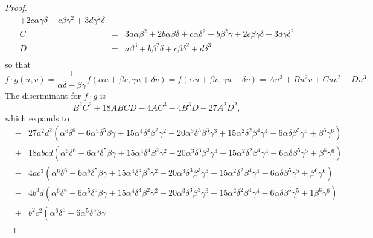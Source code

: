 \documentclass[10pt]{amsart}
\begin{document}
\begin{thm}[5 Points]
\begin{proof}
\begin{eqnarray*}
        + 2 c \alpha \gamma \delta 
        + c \beta \gamma^{2} 
        + 3 d \gamma^{2} \delta\\
        C &=& 3 a \alpha\beta^{2} 
        + 2 b \alpha \beta \delta 
        + c \alpha \delta^{2} 
        + b \beta^{2} \gamma 
        + 2 c \beta \gamma \delta
        + 3 d \gamma \delta^{2}\\
        D &=& a \beta^{3} 
        + b \beta^{2} \delta 
        + c \beta \delta^{2} 
        + d \delta^{3}\\
      \end{eqnarray*}
      so that 
      $$f \cdot g(u,v) = \frac{1}{\alpha\delta - \beta\gamma} f(\alpha u + \beta v, \gamma u + \delta v) = f(\alpha u + \beta v, \gamma u + \delta v) = Au^3 + Bu^2v + Cuv^2 + Du^3.$$
      The discriminant for $f \cdot g$ is
      $$B^2C^2 + 18ABCD - 4AC^3 - 4B^3D - 27A^2D^2,$$ 
      which expands to
      \begin{eqnarray*}
        &-& 27 a^{2} d^{2}\left(\alpha^{6} \delta^{6} 
        - 6 \alpha^{5}\delta^{5} \beta\gamma 
        + 15 \alpha^{4}\delta^{4} \beta^{2}\gamma^{2} 
        - 20 \alpha^{3}\delta^{3} \beta^{3}\gamma^{3} 
        + 15 \alpha^{2}\delta^{2} \beta^{4}\gamma^{4} 
        - 6 \alpha\delta \beta^{5}\gamma^{5} 
        + \beta^{6} \gamma^{6}\right)\\
        &+& 18a b c d \left( \alpha^{6} \delta^{6} 
        - 6 \alpha^{5}\delta^{5} \beta\gamma 
        + 15 \alpha^{4}\delta^{4} \beta^{2}\gamma^{2} 
        - 20 \alpha^{3}\delta^{3} \beta^{3}\gamma^{3} 
        + 15 \alpha^{2}\delta^{2} \beta^{4}\gamma^{4} 
        - 6 \alpha\delta \beta^{5}\gamma^{5} 
        + \beta^{6}\gamma^{6}\right)\\
        &-& 4 a c^{3} \left( \alpha^{6}\delta^{6} 
        - 6 \alpha^{5}\delta^{5} \beta\gamma 
        + 15 \alpha^{4}\delta^{4} \beta^{2}\gamma^{2} 
        - 20 \alpha^{3}\delta^{3} \beta^{3}\gamma^{3} 
        + 15 \alpha^{2}\delta^{2} \beta^{4}\gamma^{4} 
        - 6 \alpha\delta \beta^{5}\gamma^{5} 
        + \beta^{6}\gamma^{6}\right)\\
        &-& 4b^{3} d \left(\alpha^{6} \delta^{6} 
        - 6 \alpha^{5}\delta^{5} \beta\gamma 
        + 15 \alpha^{4}\delta^{4} \beta^{2}\gamma^{2} 
        - 20 \alpha^{3}\delta^{3} \beta^{3}\gamma^{3} 
        + 15 \alpha^{2}\delta^{2} \beta^{4}\gamma^{4} 
        - 6 \alpha\delta \beta^{5}\gamma^{5} 
        + 1 \beta^{6}\gamma^{6}\right)\\
        &+& b^{2} c^{2} \left(\alpha^{6}\delta^{6} 
        - 6 \alpha^{5}\delta^{5} \beta\gamma 

\end{eqnarray*}
\end{proof}
\end{thm}
\end{document}
